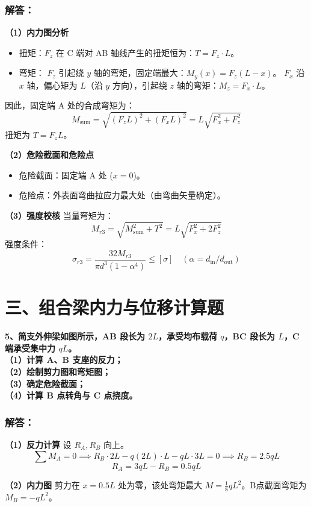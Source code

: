\documentclass[UTF8,fontset=windows]{ctexart}
\begin{document}
\subsubsection*{解答：}
\textbf{（1）内力图分析}
\begin{itemize}
    \item 扭矩：$F_z$ 在 C 端对 AB 轴线产生的扭矩恒为：$T = F_z \cdot L$。
    \item 弯矩：
    $F_z$ 引起绕 $y$ 轴的弯矩，固定端最大：$M_y(x) = F_z(L-x)$。
    $F_x$ 沿 $x$ 轴，偏心矩为 $L$（沿 $y$ 方向），引起绕 $z$ 轴的弯矩：$M_z = F_x \cdot L$。
\end{itemize}
因此，固定端 A 处的合成弯矩为：
\[
    M_{\text{sum}} = \sqrt{(F_z L)^2 + (F_x L)^2} = L\sqrt{F_x^2 + F_z^2}
\]
扭矩为 $T = F_z L$。

\textbf{（2）危险截面和危险点}
\begin{itemize}
    \item 危险截面：固定端 A 处 ($x=0$)。
    \item 危险点：外表面弯曲拉应力最大处（由弯曲矢量确定）。
\end{itemize}

\textbf{（3）强度校核}
当量弯矩为：
\[
    M_{r3} = \sqrt{M_{\text{sum}}^2 + T^2} = L\sqrt{F_x^2 + 2F_z^2}
\]
强度条件：
\[
    \sigma_{r3} = \frac{32 M_{r3}}{\pi d^3 (1 - \alpha^4)} \le [\sigma] \quad (\alpha = d_{\text{in}}/d_{\text{out}})
\]

\newpage

\section*{三、组合梁内力与位移计算题}

\textbf{5、简支外伸梁如图所示，AB 段长为 $2L$，承受均布载荷 $q$，BC 段长为 $L$，C 端承受集中力 $q L$。\\
（1）计算 A、B 支座的反力；\\
（2）绘制剪力图和弯矩图；\\
（3）确定危险截面；\\
（4）计算 B 点转角与 C 点挠度。}

\subsubsection*{解答：}
\textbf{（1）反力计算}
设 $R_A, R_B$ 向上。
\[
    \sum M_A = 0 \implies R_B \cdot 2L - q(2L) \cdot L - qL \cdot 3L = 0 \implies R_B = 2.5 qL
\]
\[
    R_A = 3qL - R_B = 0.5 qL
\]

\textbf{（2）内力图}
剪力在 $x = 0.5L$ 处为零，该处弯矩最大 $M = \frac{1}{8}qL^2$。B点截面弯矩为 $M_B = -qL^2$。
\end{document}

